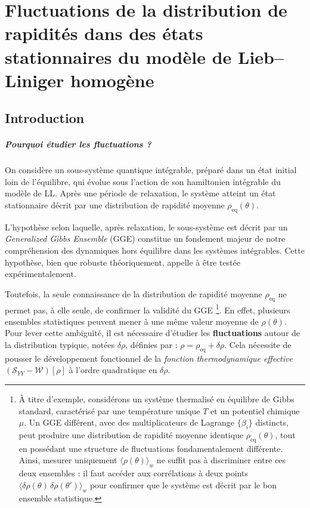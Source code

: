 \chapter{Fluctuations de la distribution de rapidités dans des états stationnaires du modèle de Lieb–Liniger homogène}
\label{chap:Fluctu}
\minitoc

\section*{Introduction}

\paragraph*{Pourquoi étudier les fluctuations ?}
On considère un sous-système quantique intégrable, préparé dans un état initial loin de l’équilibre, qui évolue sous l’action de son hamiltonien intégrable du modèle de \gls{LL}.
Après une période de relaxation, le système atteint un état stationnaire décrit par une distribution de rapidité moyenne \( \rho_{\mathrm{eq}}(\theta) \).

\smallskip

L’hypothèse selon laquelle, après relaxation, le sous-système est décrit par un \textit{Generalized Gibbs Ensemble} (\gls{GGE}) constitue un fondement majeur de notre compréhension des dynamiques hors équilibre dans les systèmes intégrables. Cette hypothèse, bien que robuste théoriquement, appelle à être testée expérimentalement.

\smallskip

Toutefois, la seule connaissance de la distribution de rapidité moyenne \( \rho_{\mathrm{eq}} \) ne permet pas, à elle seule, de confirmer la validité du \gls{GGE} \footnote{
À titre d'exemple, considérons un système thermalisé en équilibre de Gibbs standard, caractérisé par une température unique $T$ et un potentiel chimique $\mu$. Un \gls{GGE} différent, avec des multiplicateurs de Lagrange $\{\beta_i\}$ distincts, peut produire une distribution de rapidité moyenne identique $\rho_{\mathrm{eq}}(\theta)$, tout en possédant une structure de fluctuations fondamentalement différente. Ainsi, mesurer uniquement $\langle \rho(\theta) \rangle_w$ ne suffit pas à discriminer entre ces deux ensembles : il faut accéder aux corrélations à deux points $\langle \delta\rho(\theta)\,\delta\rho(\theta')\rangle_w$ pour confirmer que le système est décrit par le bon ensemble statistique.
}. En effet, plusieurs ensembles statistiques peuvent mener à une même valeur moyenne de \( \rho(\theta) \). Pour lever cette ambiguïté, il est nécessaire d’étudier les \textbf{fluctuations} autour de la distribution typique, notées \( \delta \rho \), définies par :
\(
\rho = \rho_{\mathrm{eq}} + \delta \rho.
\)
Cela nécessite de pousser le développement fonctionnel de la \emph{fonction thermodynamique effective} \( (\mathcal{S}_{YY} - \mathcal{W})[\rho] \) à l’ordre quadratique en \( \delta \rho \).



